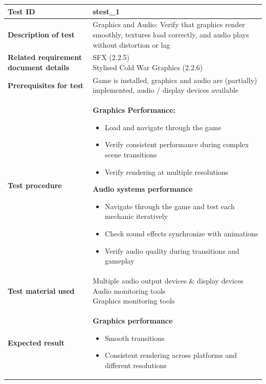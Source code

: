 \documentclass[11pt, a4paper]{article}
\begin{document}
\begin{center}
\begin{tabularx}{\linewidth}{|>{\raggedright\arraybackslash}m{4cm}|X|}
    \hline
    \textbf{Test ID} & stest\_1 \\
    \hline
    \textbf{Description of test} & Graphics and Audio: Verify that graphics render smoothly, textures load correctly, and audio plays without distortion or lag \\
    \hline
    \textbf{Related requirement document details} & \makecell[l]{
        SFX (2.2.5) \\
        Stylised Cold War Graphics (2.2.6)
    } \\
    \hline
    \textbf{Prerequisites for test} & Game is installed, graphics and audio are (partially) implemented, audio / display devices available\\
    \hline
    \textbf{Test procedure} &
    \textbf{Graphics Performance:}
    \begin{itemize}
        \item Load and navigate through the game
        \item Verify consistent performance during complex scene transitions
        \item Verify rendering at multiple resolutions
    \end{itemize}
    \textbf{Audio systems performance}
    \begin{itemize}
        \item Navigate through the game and test each mechanic iteratively
        \item Check sound effects synchronize with animations
        \item Verify audio quality during transitions and gameplay
    \end{itemize}
    \\
    \hline
    \textbf{Test material used} & \makecell[l]{
        Multiple audio output devices \& display devices \\
        Audio monitoring tools \\
        Graphics monitoring tools
    }
    \\
    \hline
    \textbf{Expected result} &
    \textbf{Graphics performance}
    \begin{itemize}
        \item Smooth transitions
        \item Consistent rendering across platforms and different resolutions
    \end{itemize}

\end{tabularx}
\end{center}
\end{document}
